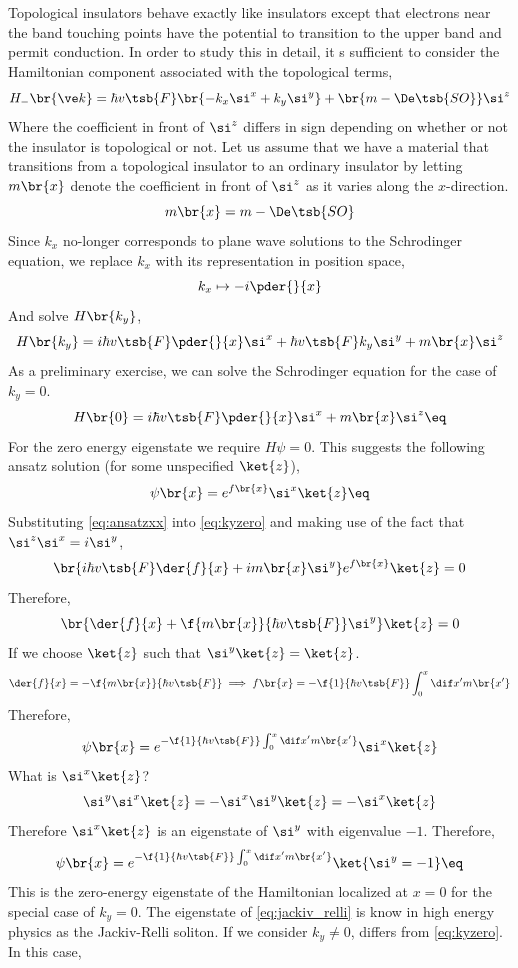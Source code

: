 \documentclass{article}
\begin{document}
Topological insulators behave exactly like insulators except that electrons near the band touching points have the potential to transition to the upper band and permit conduction. In order to study this in detail, it s sufficient to consider the Hamiltonian component associated with the topological terms,
\[ H_{-}\br{\ve k} = \hbar v\tsb{F}\br{- k_x \si^{x} +k_y \si^{y}} + \br{m - \De\tsb{SO}} \si^{z} \]
Where the coefficient in front of $\si^{z}$ differs in sign depending on whether or not the insulator is topological or not. Let us assume that we have a material that transitions from a topological insulator to an ordinary insulator by letting $m\br{x}$ denote the coefficient in front of $\si^{z}$ as it varies along the $x$-direction.
\[ m\br{x} = m - \De\tsb{SO}\]
Since $k_x$ no-longer corresponds to plane wave solutions to the Schrodinger equation, we replace $k_x$ with its representation in position space,
\[ k_x \mapsto - i\pder{}{x} \]
And solve $H\br{k_y}$,
\[ H\br{k_y} = i \hbar v\tsb{F} \pder{}{x} \si^{x} + \hbar v\tsb{F} k_y \si^{y} + m\br{x} \si^{z} \]
As a preliminary exercise, we can solve the Schrodinger equation for the case of $k_y = 0$.
\[ H\br{0} = i \hbar v\tsb{F} \pder{}{x} \si^{x} + m\br{x} \si^{z} \eq \label{eq:kyzero} \]
For the zero energy eigenstate we require $H\psi = 0$. This suggests the following ansatz solution (for some unspecified $\ket{z}$),
\[ \psi\br{x} = e^{f\br{x}} \si^{x} \ket{z} \eq \label{eq:ansatzxx}\]
Substituting \cref{eq:ansatzxx} into \cref{eq:kyzero} and making use of the fact that $\si^{z} \si^{x} = i\si^{y}$,
\[ \br{i \hbar v\tsb{F} \der{f}{x} + i m\br{x} \si^{y}} e^{f\br{x}} \ket{z} = 0 \]
Therefore,
\[ \br{\der{f}{x} + \f{m\br{x}}{\hbar v\tsb{F}} \si^{y}} \ket{z} = 0 \]
If we choose $\ket{z}$ such that $\si^{y}\ket{z} = \ket{z}$.
\[ \der{f}{x} = - \f{m\br{x}}{\hbar v\tsb{F}} \implies f\br{x} = - \f{1}{\hbar v\tsb{F}} \int_{0}^{x} \dif x' m\br{x'} \]
Therefore,
\[ \psi\br{x} = e^{- \f{1}{\hbar v\tsb{F}} \int_{0}^{x} \dif x' m\br{x'}} \si^{x} \ket{z} \]
What is $\si^{x} \ket{z}$?
\[ \si^{y}\si^{x} \ket{z} = -\si^{x}\si^{y} \ket{z} = - \si^{x}\ket{z} \]
Therefore $\si^{x}\ket{z}$ is an eigenstate of $\si^{y}$ with eigenvalue $-1$. Therefore,
\[ \psi\br{x} = e^{- \f{1}{\hbar v\tsb{F}} \int_{0}^{x} \dif x' m\br{x'}}\ket{\si^{y} = -1} \eq \label{eq:jackiv_relli}\]
This is the zero-energy eigenstate of the Hamiltonian localized at $x = 0$ for the special case of $k_y = 0$.
The eigenstate of \cref{eq:jackiv_relli} is know in high energy physics as the Jackiv-Relli soliton.
If we consider $k_y \neq 0$, differs from \cref{eq:kyzero}. In this case,
\end{document}

